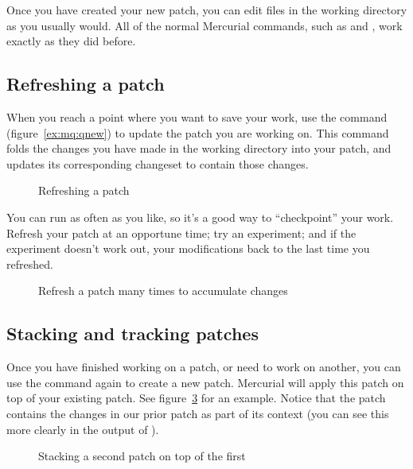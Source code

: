 Once you have created your new patch, you can edit files in the
working directory as you usually would.  All of the normal Mercurial
commands, such as  and , work exactly as
they did before.

\subsection{Refreshing a patch}

When you reach a point where you want to save your work, use the
 command (figure~\ref{ex:mq:qnew}) to update the patch
you are working on.  This command folds the changes you have made in
the working directory into your patch, and updates its corresponding
changeset to contain those changes.

\begin{figure}[ht]
  \caption{Refreshing a patch}
  \label{ex:mq:qrefresh}
\end{figure}

You can run  as often as you like, so it's a good way
to ``checkpoint'' your work.  Refresh your patch at an opportune
time; try an experiment; and if the experiment doesn't work out,
 your modifications back to the last time you refreshed.

\begin{figure}[ht]
  \caption{Refresh a patch many times to accumulate changes}
  \label{ex:mq:qrefresh2}
\end{figure}

\subsection{Stacking and tracking patches}

Once you have finished working on a patch, or need to work on another,
you can use the  command again to create a new patch.
Mercurial will apply this patch on top of your existing patch.  See
figure~\ref{ex:mq:qnew2} for an example.  Notice that the patch
contains the changes in our prior patch as part of its context (you
can see this more clearly in the output of ).

\begin{figure}[ht]
  \caption{Stacking a second patch on top of the first}
  \label{ex:mq:qnew2}
\end{figure}

